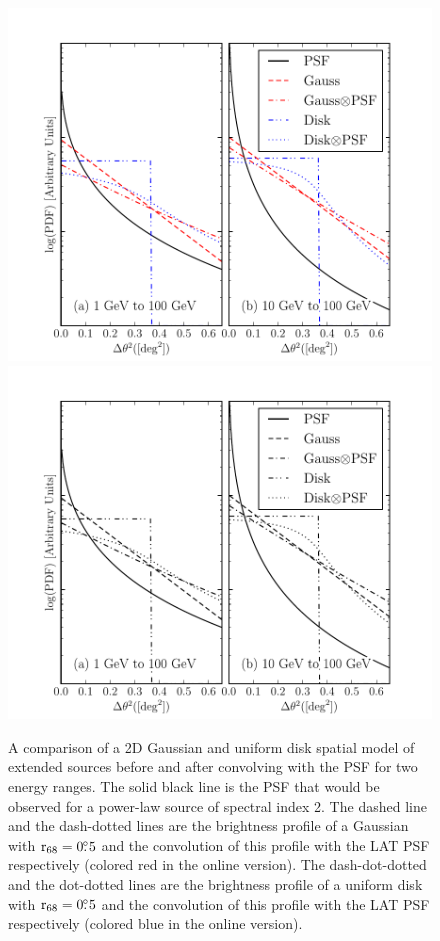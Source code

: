 \clearpage
\begin{figure}
    \ifcolorfigure
      \includegraphics{mc_plots/compare_disk_gauss_color.pdf}
    \else
      \includegraphics{mc_plots/compare_disk_gauss_bw.pdf}
    \fi
    \caption{
    A comparison of a 2D Gaussian and uniform disk spatial model
    of extended sources before and after convolving with the PSF for two
    energy ranges.  The solid black line is the PSF that would be observed
    for a power-law source of spectral index 2. The dashed line
    and the dash-dotted lines are 
    the brightness profile of a Gaussian with ${\mathrm{r}_{68}}=0\mbox{$.\!\!^\circ$}5$
    and the convolution of this profile with the LAT PSF respectively
    (colored red in the online version).
    The dash-dot-dotted and the dot-dotted lines are the brightness profile
    of a uniform disk with ${\mathrm{r}_{68}}=0\mbox{$.\!\!^\circ$}5$ and the convolution
    of this profile with the LAT PSF respectively (colored blue in the online version).
    }
  \end{figure}



